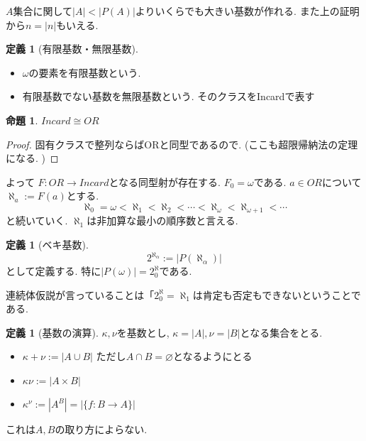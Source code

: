 \documentclass[dvipdfmx,a4paper,11pt]{report}
\theoremstyle{definition}
\newtheorem{prop}[thm]{命題}
\newtheorem{dfn}[thm]{定義}
\begin{document}
$A$集合に関して$|A| < |P(A)|$よりいくらでも大きい基数が作れる. また上の証明から$n=|n|$もいえる. 

 \begin{tcolorbox}
 [colback = white, colframe = green!35!black, fonttitle = \bfseries,breakable = true]
\begin{dfn}[有限基数・無限基数]
\begin{itemize}
\item $\omega$の要素を有限基数という.
\item 有限基数でない基数を無限基数という. そのクラスをIncardで表す
\end{itemize}
\end{dfn}
\end{tcolorbox}

 \begin{tcolorbox}
 [colback = white, colframe = green!35!black, fonttitle = \bfseries,breakable = true]
\begin{prop}
$Incard \cong OR$
\end{prop}
\end{tcolorbox}
\begin{proof}
固有クラスで整列ならばORと同型であるので. (ここも超限帰納法の定理になる. )
\end{proof}
よって
$F : OR \to Incard$となる同型射が存在する.
$F_{0}= \omega$である. 
$a \in OR$について$\aleph_{a}:=F(a)$とする. 
$$
\aleph_0 = \omega < \aleph_1 <\aleph_2 < \cdots < \aleph_{\omega}<\aleph_{\omega+1}<\cdots
$$
と続いていく. 
$\aleph_1 $は非加算な最小の順序数と言える. 

 \begin{tcolorbox}
 [colback = white, colframe = green!35!black, fonttitle = \bfseries,breakable = true]
\begin{dfn}[ベキ基数]
$$
2^{\aleph_\alpha} := |P(\aleph_\alpha)|
$$
として定義する. 特に$|P(\omega)|=2^\aleph_0 $である. 
\end{dfn}
\end{tcolorbox}

連続体仮説が言っていることは「$2^\aleph_0 = \aleph_1 $は肯定も否定もできないということである. 

 \begin{tcolorbox}
 [colback = white, colframe = green!35!black, fonttitle = \bfseries,breakable = true]
\begin{dfn}[基数の演算]
$\kappa, \nu$を基数とし, $\kappa = |A|, \nu=|B|$となる集合をとる. 
\begin{itemize}
\item $\kappa + \nu := |A \cup B|$ ただし$A \cap B=\varnothing$となるようにとる
\item $\kappa \nu := |A \times B|$
\item $\kappa^{\nu} := |A^B|=|\{ f : B \to A\}|$
\end{itemize}
これは$A,B$の取り方によらない. 
\end{dfn}
\end{tcolorbox}
\end{document}
